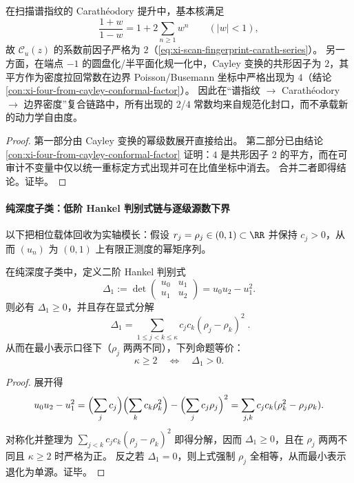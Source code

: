 \begin{proposition}\label{prop:xi-scan-coefficient-four-double-cayley}
在扫描谱指纹的 Carath\'eodory 提升中，基本核满足
\[
\frac{1+w}{1-w}=1+2\sum_{n\ge 1}w^n\qquad(|w|<1),
\]
故 \(\mathscr{C}_u(z)\) 的系数前因子严格为 \(2\)（\eqref{eq:xi-scan-fingerprint-carath-series}）。
另一方面，在端点 \(-1\) 的圆盘化/半平面化规一化中，Cayley 变换的共形因子为 \(2\)，其平方作为密度拉回常数在边界 Poisson/Busemann 坐标中严格出现为 \(4\)（结论 \ref{con:xi-four-from-cayley-conformal-factor}）。
因此在“谱指纹 \(\to\) Carath\'eodory \(\to\) 边界密度”复合链路中，所有出现的 \(2\)/\(4\) 常数均来自规范化封口，而不承载新的动力学自由度。
\end{proposition}
\begin{proof}
第一部分由 Cayley 变换的幂级数展开直接给出。
第二部分已由结论 \ref{con:xi-four-from-cayley-conformal-factor} 证明：\(4\) 是共形因子 \(2\) 的平方，而在可审计不变量中仅以统一重标定方式出现并可在比值坐标中消去。
合并二者即得结论。证毕。
\end{proof}

\paragraph{纯深度子类：低阶 Hankel 判别式链与逐级源数下界}
以下把相位载体回收为实轴模长：假设 \(r_j=\rho_j\in(0,1)\subset\RR\) 并保持 \(c_j>0\)，从而 \((u_n)\) 为 \((0,1)\) 上有限正测度的幂矩序列。

\begin{proposition}[双源门槛的最小代数证书：\texorpdfstring{$\kappa\ge 2$}{kappa>=2} 的首个判别式]\label{prop:xi-scan-two-source-min-discriminant}
在纯深度子类中，定义二阶 Hankel 判别式
\[
\Delta_1
:=\det\begin{pmatrix}u_0 & u_1\\[2pt] u_1 & u_2\end{pmatrix}
=u_0u_2-u_1^2.
\]
则必有 \(\Delta_1\ge 0\)，并且存在显式分解
\[
\boxed{\;
\Delta_1=\sum_{1\le j<k\le \kappa}c_jc_k(\rho_j-\rho_k)^2\; }.
\]
从而在最小表示口径下（\(\rho_j\) 两两不同），下列命题等价：
\[
\boxed{\;\kappa\ge 2\quad\Longleftrightarrow\quad \Delta_1>0.\;}
\]
\end{proposition}
\begin{proof}
展开得
\[
u_0u_2-u_1^2
=\Bigl(\sum_j c_j\Bigr)\Bigl(\sum_k c_k\rho_k^2\Bigr)-\Bigl(\sum_j c_j\rho_j\Bigr)^2
=\sum_{j,k}c_jc_k(\rho_k^2-\rho_j\rho_k).
\]
对称化并整理为 \(\sum_{j<k}c_jc_k(\rho_j-\rho_k)^2\) 即得分解，因而 \(\Delta_1\ge 0\)，且在 \(\rho_j\) 两两不同且 \(\kappa\ge 2\) 时严格为正。
反之若 \(\Delta_1=0\)，则上式强制 \(\rho_j\) 全相等，从而最小表示退化为单源。证毕。
\end{proof}


